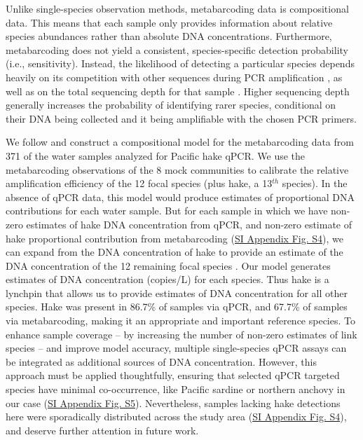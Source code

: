 \documentclass{article}
\begin{document}
Unlike single-species observation methods, metabarcoding data is compositional data. This means that each sample only provides information about relative species abundances rather than absolute DNA concentrations. Furthermore, metabarcoding does not yield a consistent, species-specific detection probability (i.e., sensitivity). Instead, the likelihood of detecting a particular species depends heavily on its competition with other sequences during PCR amplification \cite{shelton2023}, as well as on the total sequencing depth for that sample \cite{kelly2019}. Higher sequencing depth generally increases the probability of identifying rarer species, conditional on their DNA being collected and it being amplifiable with the chosen PCR primers.

We follow \cite{shelton2023} and construct a compositional model for the metabarcoding data from 371 of the water samples analyzed for Pacific hake qPCR. We use the metabarcoding observations of the 8 mock communities to calibrate the relative amplification efficiency of the 12 focal species (plus hake, a 13$^{th}$ species). In the absence of qPCR data, this model would produce estimates of proportional DNA contributions for each water sample. But for each sample in which we have non-zero estimates of hake DNA concentration from qPCR, and non-zero estimate of hake proportional contribution from metabarcoding (\href{SI_Appendix.pdf}{SI Appendix Fig. S4}), we can expand from the DNA concentration of hake to provide an estimate of the DNA concentration of the 12 remaining focal species \cite{allan2023}. Our model generates estimates of DNA concentration (copies/L) for each species. Thus hake is a lynchpin that allows us to provide estimates of DNA concentration for all other species. Hake was present in 86.7\% of samples via qPCR, and 67.7\% of samples via metabarcoding, making it an appropriate and important reference species. To enhance sample coverage -- by increasing the number of non-zero estimates of link species -- and improve model accuracy, multiple single-species qPCR assays can be integrated as additional sources of DNA concentration. However, this approach must be applied thoughtfully, ensuring that selected qPCR targeted species have minimal co-occurrence, like Pacific sardine or northern anchovy in our case (\href{SI_Appendix.pdf}{SI Appendix Fig. S5}). Nevertheless, samples lacking hake detections here were sporadically distributed across the study area (\href{SI_Appendix.pdf}{SI Appendix Fig. S4}), and deserve further attention in future work.
\end{document}
